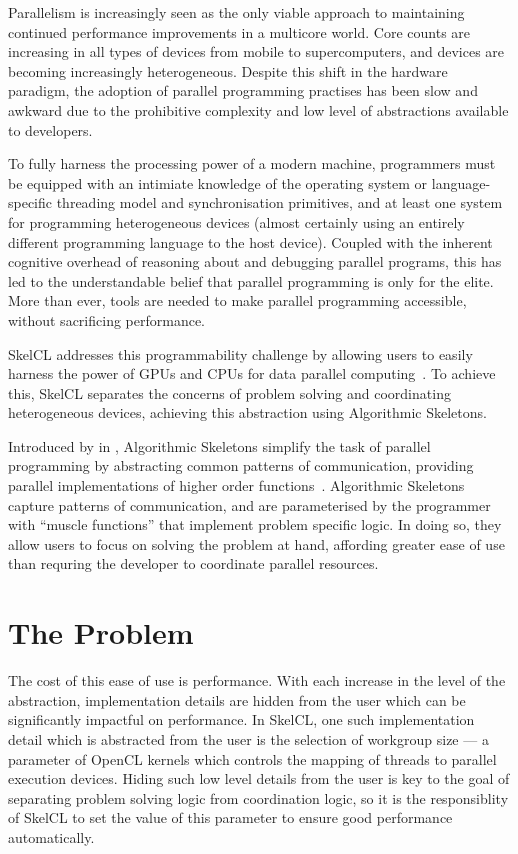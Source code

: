 Parallelism is increasingly seen as the only viable approach to
maintaining continued performance improvements in a multicore
world. Core counts are increasing in all types of devices from mobile
to supercomputers, and devices are becoming increasingly
heterogeneous. Despite this shift in the hardware paradigm, the
adoption of parallel programming practises has been slow and awkward
due to the prohibitive complexity and low level of abstractions
available to developers.

To fully harness the processing power of a modern machine, programmers
must be equipped with an intimiate knowledge of the operating system
or language-specific threading model and synchronisation primitives,
and at least one system for programming heterogeneous devices (almost
certainly using an entirely different programming language to the host
device). Coupled with the inherent cognitive overhead of reasoning
about and debugging parallel programs, this has led to the
understandable belief that parallel programming is only for the
elite. More than ever, tools are needed to make parallel programming
accessible, without sacrificing performance.

SkelCL addresses this programmability challenge by allowing users to
easily harness the power of GPUs and CPUs for data parallel
computing~\cite{Steuwer2011}. To achieve this, SkelCL separates the
concerns of problem solving and coordinating heterogeneous devices,
achieving this abstraction using Algorithmic Skeletons.

Introduced by \citeauthor{Cole1989} in \citeyear{Cole1989},
Algorithmic Skeletons simplify the task of parallel programming by
abstracting common patterns of communication, providing parallel
implementations of higher order functions~\cite{Cole1989}. Algorithmic
Skeletons capture patterns of communication, and are parameterised by
the programmer with ``muscle functions'' that implement problem
specific logic. In doing so, they allow users to focus on solving the
problem at hand, affording greater ease of use than requring the
developer to coordinate parallel resources.


\section{The Problem}

The cost of this ease of use is performance. With each increase in the
level of the abstraction, implementation details are hidden from the
user which can be significantly impactful on performance. In SkelCL,
one such implementation detail which is abstracted from the user is
the selection of workgroup size --- a parameter of OpenCL kernels
which controls the mapping of threads to parallel execution
devices. Hiding such low level details from the user is key to the
goal of separating problem solving logic from coordination logic, so
it is the responsiblity of SkelCL to set the value of this parameter
to ensure good performance automatically.

